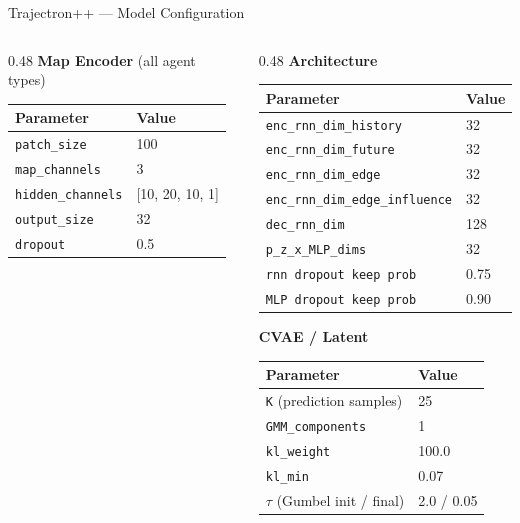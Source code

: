 \begin{frame}[noframenumbering]{Trajectron++ — Model Configuration}
\begin{columns}[T]
\begin{column}{0.48\textwidth}
      \vspace{0.3em}
      \textbf{Map Encoder} (all agent types)\\[0.15em]
      \begin{tabular}{@{}ll@{}}
        \toprule
        Parameter & Value \\
        \midrule
        \texttt{patch\_size}      & 100 \\
        \texttt{map\_channels}    & 3 \\
        \texttt{hidden\_channels} & [10, 20, 10, 1] \\
        \texttt{output\_size}     & 32 \\
        \texttt{dropout}          & 0.5 \\
        \bottomrule
      \end{tabular}
    \end{column}
    \begin{column}{0.48\textwidth}
      \textbf{Architecture}\\[0.15em]
      \begin{tabular}{@{}ll@{}}
        \toprule
        Parameter & Value \\
        \midrule
        \texttt{enc\_rnn\_dim\_history}        & 32 \\
        \texttt{enc\_rnn\_dim\_future}         & 32 \\
        \texttt{enc\_rnn\_dim\_edge}           & 32 \\
        \texttt{enc\_rnn\_dim\_edge\_influence}& 32 \\
        \texttt{dec\_rnn\_dim}                 & 128 \\
        \texttt{p\_z\_x\_MLP\_dims}            & 32 \\
        \texttt{rnn dropout keep prob}         & 0.75 \\
        \texttt{MLP dropout keep prob}         & 0.90 \\
        \bottomrule
      \end{tabular}

      \vspace{0.3em}
      \textbf{CVAE / Latent}\\[0.15em]
      \begin{tabular}{@{}ll@{}}
        \toprule
        Parameter & Value \\
        \midrule
        \texttt{K} (prediction samples) & 25 \\
        \texttt{GMM\_components}         & 1 \\
        \texttt{kl\_weight}              & 100.0 \\
        \texttt{kl\_min}                 & 0.07 \\
        $\tau$ (Gumbel init / final)     & 2.0 / 0.05 \\
        \bottomrule
      \end{tabular}
    \end{column}
  \end{columns}
\end{frame}

